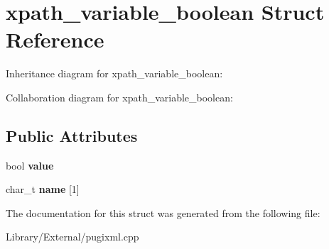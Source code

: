 \hypertarget{structxpath__variable__boolean}{}\section{xpath\+\_\+variable\+\_\+boolean Struct Reference}
\label{structxpath__variable__boolean}


Inheritance diagram for xpath\+\_\+variable\+\_\+boolean\+:


Collaboration diagram for xpath\+\_\+variable\+\_\+boolean\+:
\subsection*{Public Attributes}
\begin{DoxyCompactItemize}
\item 
\hypertarget{structxpath__variable__boolean_ab54117a6cced8c3e029724651df4d404}{}bool {\bfseries value}\label{structxpath__variable__boolean_ab54117a6cced8c3e029724651df4d404}

\item 
\hypertarget{structxpath__variable__boolean_a2b2cb81ee5c9a19a667428d08d5bb951}{}char\+\_\+t {\bfseries name} \mbox{[}1\mbox{]}\label{structxpath__variable__boolean_a2b2cb81ee5c9a19a667428d08d5bb951}

\end{DoxyCompactItemize}


The documentation for this struct was generated from the following file\+:\begin{DoxyCompactItemize}
\item 
Library/\+External/pugixml.\+cpp\end{DoxyCompactItemize}
